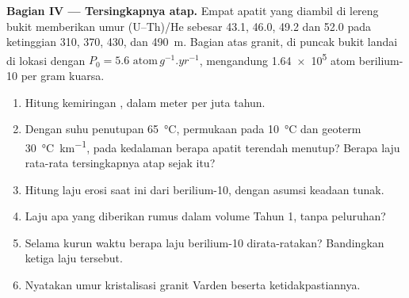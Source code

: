 \begin{problem}
\medskip\noindent\textbf{Bagian IV --- Tersingkapnya atap.} Empat apatit yang diambil
di lereng bukit memberikan umur (U--Th)/He sebesar 43.1, 46.0, 49.2 dan
\qty{52.0}{\Ma} pada ketinggian 310, 370, 430, dan \qty{490}{m}. Bagian atas granit,
di puncak bukit landai di lokasi dengan $P_0 = \num{5.6}\text{ atom}\,\unit{g^{-1}.yr^{-1}}$,
mengandung \num{1.64e5} atom berilium-10 per gram kuarsa.
\begin{enumerate}[resume]
\item Hitung kemiringan , dalam meter per
juta tahun.
\item Dengan suhu penutupan \qty{65}{\celsius}, permukaan pada
\qty{10}{\celsius} dan geoterm \qty{30}{\celsius.km^{-1}}, pada kedalaman berapa
apatit terendah menutup? Berapa laju rata-rata tersingkapnya atap sejak itu?
\item Hitung laju erosi saat ini dari berilium-10, dengan asumsi
keadaan tunak.
\item Laju apa yang diberikan rumus dalam volume Tahun 1, tanpa peluruhan?
\item Selama kurun waktu berapa laju berilium-10 dirata-ratakan? Bandingkan ketiga
laju tersebut.
\item Nyatakan umur kristalisasi granit Varden beserta
ketidakpastiannya.
\end{enumerate}
\end{problem}
